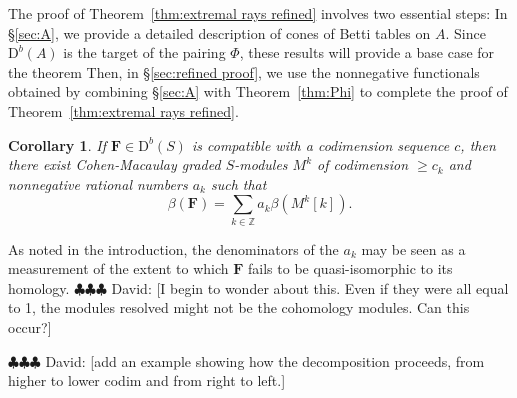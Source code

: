 \documentclass[12pt]{amsart}
\newtheorem{cor}[lemma]{Corollary}
\theoremstyle{definition}
\theoremstyle{remark}
\newcommand{\ZZ}{\mathbb{Z}}
\newcommand{\cc}{c}
\newcommand{\FF}{\mathbf{F}}
\newcommand{\DD}{\mathrm{D}}
\newcommand{\david}[1]{{\color{red} \sf $\clubsuit\clubsuit\clubsuit$ David: [#1]}}
\begin{document}
The proof of Theorem~\ref{thm:extremal rays refined} involves two essential steps:  In \S\ref{sec:A}, we provide a detailed description of cones of Betti tables on $A$.  Since $\DD^b(A)$ is the target of the pairing $\Phi$, these results will provide a base case for the theorem  Then, in \S\ref{sec:refined proof}, 
we use the nonnegative functionals obtained by combining  \S\ref{sec:A} with Theorem~\ref{thm:Phi} to complete the proof of Theorem~\ref{thm:extremal rays refined}. 

\begin{cor}\label{cor:decompose refined}
If $\FF\in \DD^b(S)$ is compatible with a codimension sequence $\cc$,
then there exist Cohen-Macaulay graded $S$-modules $M^k$ of codimension $\geq \cc_k$ and nonnegative rational numbers $a_k$ such that
\[
\beta(\FF)=\sum_{k\in \ZZ} a_k\beta(M^k[k]).
\]
\end{cor}
As noted in the introduction, the denominators of the $a_k$ may be seen as a measurement of the extent to which $\FF$ fails to be quasi-isomorphic to its homology.  \david{I begin to wonder about this. Even if they were all equal to 1, the modules resolved might not be the cohomology modules. Can this occur?}

\david{add an example showing how the decomposition proceeds, from higher to lower codim and from right to left.}
\end{document}
